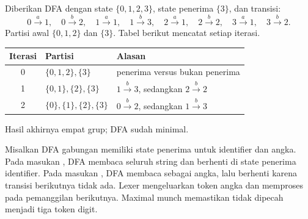 \begin{contoh}[Minimalisasi]
Diberikan DFA dengan state \(\{0,1,2,3\}\), state penerima
\(\{3\}\), dan transisi:
\[
0 \xrightarrow{a} 1,\quad
0 \xrightarrow{b} 2,\quad
1 \xrightarrow{a} 1,\quad
1 \xrightarrow{b} 3,\quad
2 \xrightarrow{a} 1,\quad
2 \xrightarrow{b} 2,\quad
3 \xrightarrow{a} 1,\quad
3 \xrightarrow{b} 2.
\]
Partisi awal \(\{0,1,2\}\) dan \(\{3\}\). Tabel berikut mencatat
setiap iterasi.

\begin{center}
\small
\begin{tabular}{@{}c l l@{}}
\toprule
\textbf{Iterasi} & \textbf{Partisi} & \textbf{Alasan} \\
\midrule
0 & \(\{0,1,2\}, \{3\}\) & penerima versus bukan penerima \\
1 & \(\{0,1\}, \{2\}, \{3\}\) &
\(1 \xrightarrow{b} 3\), sedangkan \(2 \xrightarrow{b} 2\) \\
2 & \(\{0\}, \{1\}, \{2\}, \{3\}\) &
\(0 \xrightarrow{b} 2\), sedangkan \(1 \xrightarrow{b} 3\) \\
\bottomrule
\end{tabular}
\end{center}

Hasil akhirnya empat grup; DFA sudah minimal.
\end{contoh}

\begin{contoh}
Misalkan DFA gabungan memiliki state penerima untuk identifier dan
angka. Pada masukan , DFA membaca seluruh string dan
berhenti di state penerima identifier. Pada masukan ,
DFA membaca  sebagai angka, lalu berhenti karena transisi
berikutnya tidak ada. Lexer mengeluarkan token angka  dan
memproses  pada pemanggilan berikutnya. Maximal munch
memastikan  tidak dipecah menjadi tiga token digit.
\end{contoh}
